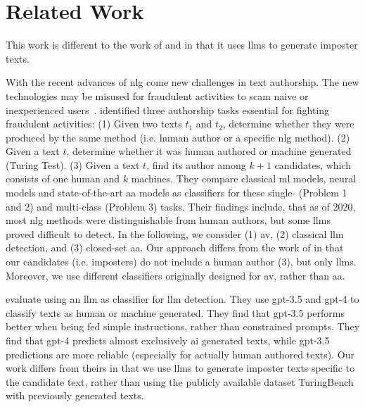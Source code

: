 \chapter{Related Work}
\label{chap:related_work}

This work is different to the work of \cite{koppel_determining_2014} and \cite{kocher_unine_2015} 
in that it uses \acp{llm} to generate imposter texts.


With the recent advances of \ac{nlg} come new challenges in text authorship.
The new technologies may be misused for fraudulent activities to scam naive or inexperienced users~\cite{uchendu_authorship_2020,bhattacharjee_fighting_2024}.
\citet{uchendu_authorship_2020} identified three authorship tasks essential for fighting fraudulent activities:
(1) Given two texts $t_1$ and $t_2$, determine whether they were produced by the same method (i.e. human author or a specific \ac{nlg} method).
(2) Given a text $t$, determine whether it was human authored or machine generated (Turing Test).
(3) Given a text $t$, find its author among $k+1$ candidates, which consists of one human and $k$ machines.
They compare classical \ac{ml} models, neural models and state-of-the-art \ac{aa} models as classifiers 
for these single- (Problem 1 and 2) and multi-class (Problem 3) tasks.
Their findings include, that as of 2020, most \ac{nlg} methods were distinguishable from human authors, 
but some \acp{llm} proved difficult to detect.
In the following, we consider (1) \ac{av}, (2) classical \ac{llm} detection, and (3) closed-set \ac{aa}.
Our approach differs from the work of \citet{uchendu_authorship_2020} in that our candidates (i.e. imposters) do not include a human author (3), 
but only \acp{llm}.
Moreover, we use different classifiers originally designed for \ac{av}, rather than \ac{aa}.

\citet{bhattacharjee_fighting_2024} evaluate using an \ac{llm} as classifier for \ac{llm} detection.
They use \ac{gpt}-3.5 and \ac{gpt}-4 to classify texts as human or machine generated.
They find that \ac{gpt}-3.5 performs better when being fed simple instructions, rather than constrained prompts.
They find that \ac{gpt}-4 predicts almost exclusively \ac{ai} generated texts, 
while \ac{gpt}-3.5 predictions are more reliable (especially for actually human authored texts).
Our work differs from theirs in that we use \acp{llm} to generate imposter texts specific to the candidate text, 
rather than using the publicly available dataset TuringBench with previously generated texts.

